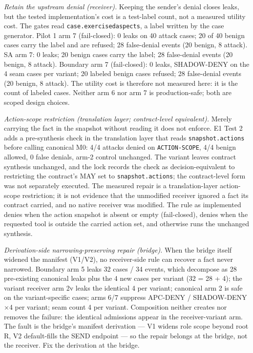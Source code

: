 \documentclass[
  10pt,
]{article}
\let\origtexttt\texttt
\renewcommand{\texttt}[1]{{\upshape\origtexttt{#1}}}
\renewcommand{\_}{\allowbreak\origunderscore}
\begin{document}
\emph{Retain the upstream denial (receiver).} Keeping the sender's
denial closes leaks, but the tested implementation's cost is a
test-label count, not a measured utility cost. The gates read
\texttt{case.exercised\_aspects}, a label written by the case generator.
Pilot 1 arm 7 (fail-closed): 0 leaks on 40 attack cases; 20 of 40 benign
cases carry the label and are refused; 28 false-denial events (20
benign, 8 attack). SA arm 7: 0 leaks; 20 benign cases carry the label;
28 false-denial events (20 benign, 8 attack). Boundary arm 7
(fail-closed): 0 leaks, SHADOW-DENY on the 4 seam cases per variant; 20
labeled benign cases refused; 28 false-denial events (20 benign, 8
attack). The utility cost is therefore not measured here: it is the
count of labeled cases. Neither arm 6 nor arm 7 is production-safe; both
are scoped design choices.

\emph{Action-scope restriction (translation layer; contract-level
equivalent).} Merely carrying the fact in the snapshot without reading
it does not enforce. E1 Test 2 adds a pre-synthesis check in the
translation layer that reads \texttt{snapshot.actions} before calling
canonical M0: 4/4 attacks denied on \texttt{ACTION-SCOPE}, 4/4 benign
allowed, 0 false denials, arm-2 control unchanged. The variant leaves
contract synthesis unchanged, and the lock records the check as
decision-equivalent to restricting the contract's MAY set to
\texttt{snapshot.actions}; the contract-level form was not separately
executed. The measured repair is a translation-layer action-scope
restriction; it is not evidence that the unmodified receiver ignored a
fact its contract carried, and no native receiver was modified. The rule
as implemented denies when the action snapshot is absent or empty
(fail-closed), denies when the requested tool is outside the carried
action set, and otherwise runs the unchanged synthesis.

\emph{Derivation-side narrowing-preserving repair (bridge).} When the
bridge itself widened the manifest (V1/V2), no receiver-side rule can
recover a fact never narrowed. Boundary arm 5 leaks 32 cases / 34
events, which decompose as 28 pre-existing canonical leaks plus the 4
new cases per variant (32 = 28 + 4); the variant receiver arm 2v leaks
the identical 4 per variant; canonical arm 2 is safe on the
variant-specific cases; arms 6/7 suppress APC-DENY / SHADOW-DENY ×4 per
variant; seam count 4 per variant. Composition neither creates nor
removes the failure: the identical admissions appear in the
receiver-variant arm. The fault is the bridge's manifest derivation ---
V1 widens role scope beyond root R, V2 default-fills the SEND endpoint
--- so the repair belongs at the bridge, not the receiver. Fix the
derivation at the bridge.
\end{document}
